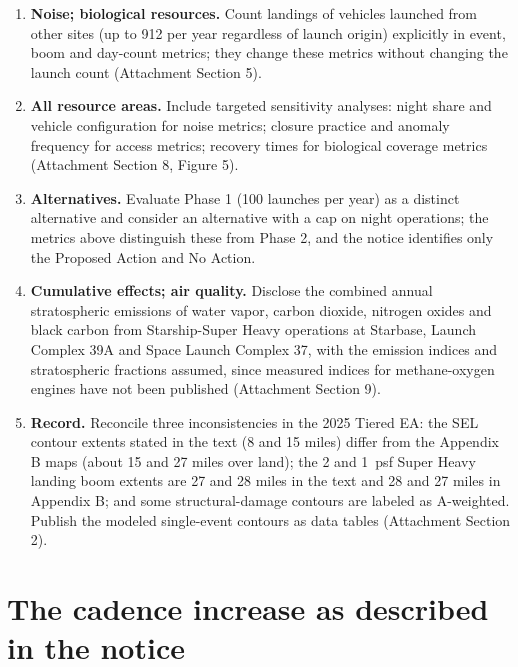 \documentclass[11pt]{article}
\begin{document}
\begin{enumerate}[leftmargin=*, itemsep=0pt]
\item \textbf{Noise; biological resources.} Count landings of vehicles launched from other sites (up to 912 per year regardless of launch origin) explicitly in event, boom and day-count metrics; they change these metrics without changing the launch count (Attachment Section 5).
\item \textbf{All resource areas.} Include targeted sensitivity analyses: night share and vehicle configuration for noise metrics; closure practice and anomaly frequency for access metrics; recovery times for biological coverage metrics (Attachment Section 8, Figure 5).
\item \textbf{Alternatives.} Evaluate Phase 1 (100 launches per year) as a distinct alternative and consider an alternative with a cap on night operations; the metrics above distinguish these from Phase 2, and the notice identifies only the Proposed Action and No Action.
\item \textbf{Cumulative effects; air quality.} Disclose the combined annual stratospheric emissions of water vapor, carbon dioxide, nitrogen oxides and black carbon from Starship-Super Heavy operations at Starbase, Launch Complex 39A and Space Launch Complex 37, with the emission indices and stratospheric fractions assumed, since measured indices for methane-oxygen engines have not been published (Attachment Section 9).
\item \textbf{Record.} Reconcile three inconsistencies in the 2025 Tiered EA: the SEL contour extents stated in the text (8 and 15 miles) differ from the Appendix B maps (about 15 and 27 miles over land); the 2 and 1~psf Super Heavy landing boom extents are 27 and 28 miles in the text and 28 and 27 miles in Appendix B; and some structural-damage contours are labeled as A-weighted. Publish the modeled single-event contours as data tables (Attachment Section 2).
\end{enumerate}

\clearpage
\section{The cadence increase as described in the notice}
\end{document}
